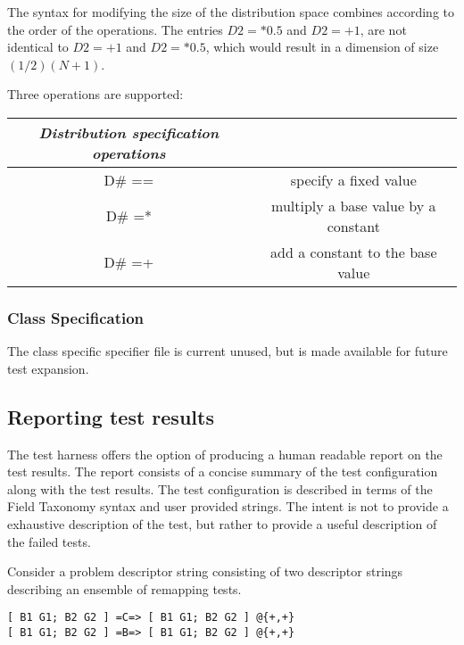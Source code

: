 The syntax for modifying the size of the distribution space combines according to the order of the operations. The entries $D2=* 0.5$ and $D2=+ 1$, are not identical to $D2=+ 1$ and $D2=* 0.5$, which would result in a dimension of size $(1/2)(N+1)$.

Three operations are supported:
\begin{center}
\begin{tabular}{| c | c |} \hline 
{\em Distribution specification operations}  \\
\hline \hline
 D\# == & specify a fixed value \\
 D\# =* & multiply a base value by a constant \\
 D\# =+ & add a constant to the base value  \\
 \hline 
\end{tabular}
\end{center}

\subsubsection{Class Specification}
The class specific specifier file is current unused, but is made available for future test expansion.


\subsection{Reporting test results}
The test harness offers the option of producing a human readable report on the test results. The report consists of a concise summary of the test configuration along with the test results. The test configuration is described in terms of the Field Taxonomy syntax and user provided strings. The intent is not to provide a exhaustive description of the test, but rather to provide a useful description of the failed tests.

Consider a problem descriptor string consisting of two descriptor strings describing an ensemble of remapping tests. 
\begin{center}
\begin{verbatim}
[ B1 G1; B2 G2 ] =C=> [ B1 G1; B2 G2 ] @{+,+}
[ B1 G1; B2 G2 ] =B=> [ B1 G1; B2 G2 ] @{+,+} 
\end{verbatim}
\end{center}

